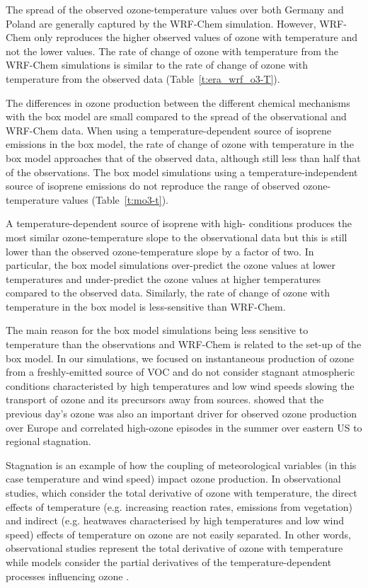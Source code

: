 The spread of the observed ozone-temperature values over both Germany and Poland are generally captured by the WRF-Chem simulation.
However, WRF-Chem only reproduces the higher observed values of ozone with temperature and not the lower values.
The rate of change of ozone with temperature from the WRF-Chem simulations is similar to the rate of change of ozone with temperature from the observed data (Table~\ref{t:era_wrf_o3-T}).

The differences in ozone production between the different chemical mechanisms with the box model are small compared to the spread of the observational and WRF-Chem data.
When using a temperature-dependent source of isoprene emissions in the box model, the rate of change of ozone with temperature in the box model approaches that of the observed data, although still less than half that of the observations.
The box model simulations using a temperature-independent source of isoprene emissions do not reproduce the range of observed ozone-temperature values (Table~\ref{t:mo3-t}).

A temperature-dependent source of isoprene with high- conditions produces the most similar ozone-temperature slope to the observational data but this is still lower than the observed ozone-temperature slope by a factor of two.
In particular, the box model simulations over-predict the ozone values at lower temperatures and under-predict the ozone values at higher temperatures compared to the observed data.
Similarly, the rate of change of ozone with temperature in the box model is less-sensitive than WRF-Chem.

The main reason for the box model simulations being less sensitive to temperature than the observations and WRF-Chem is related to the set-up of the box model.
In our simulations, we focused on instantaneous production of ozone from a freshly-emitted source of VOC and do not consider stagnant atmospheric conditions characteristed by high temperatures and low wind speeds slowing the transport of ozone and its precursors away from sources.
\citet{Otero:2016} showed that the previous day's ozone was also an important driver for observed ozone production over Europe and \citet{Jacob:1993} correlated high-ozone episodes in the summer over eastern US to regional stagnation.

Stagnation is an example of how the coupling of meteorological variables (in this case temperature and wind speed) impact ozone production.
In observational studies, which consider the total derivative of ozone with temperature, the direct effects of temperature (e.g. increasing reaction rates, emissions from vegetation) and indirect (e.g. heatwaves characterised by high temperatures and low wind speed) effects of temperature on ozone are not easily separated.
In other words, observational studies represent the total derivative of ozone with temperature while models consider the partial derivatives of the temperature-dependent processes influencing ozone \citep{Rasmussen:2013}. 

